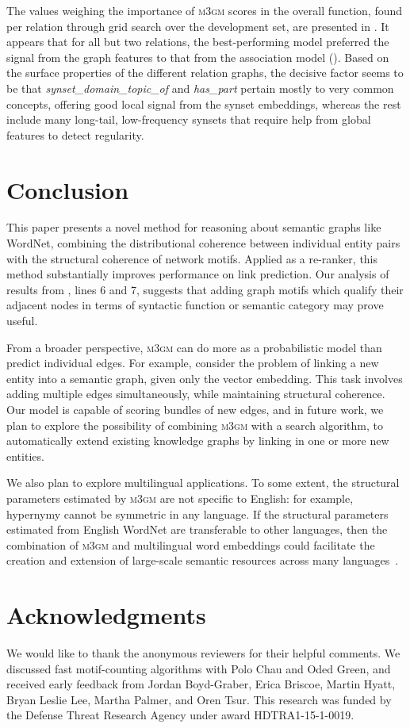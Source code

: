 \documentclass[11pt,twocolumn]{article}
\newcommand{\WN}[0]{WordNet}
\newcommand{\sysname}[0]{\textsc{m3gm}}
\begin{document}
The  values weighing the importance of \sysname{} scores in the overall function, found per relation through grid search over the development set, are presented in .
It appears that for all but two relations, the best-performing model preferred the signal from the graph features to that from the association model ().
Based on the surface properties of the different relation graphs, the decisive factor seems to be that \textit{synset\_domain\_topic\_of} and \textit{has\_part}  pertain mostly to very common concepts, offering good local signal from the synset embeddings, whereas the rest include many long-tail, low-frequency synsets that require help from global features to detect regularity.
 
\pagebreak

\section{Conclusion}
This paper presents a novel method for reasoning about semantic graphs like \WN, combining the distributional coherence between individual entity pairs with the structural coherence of network motifs.
Applied as a re-ranker, this method substantially improves performance on link prediction.
Our analysis of results from , lines 6 and 7, suggests that adding graph motifs which qualify their adjacent nodes in terms of syntactic function or semantic category may prove useful.

From a broader perspective, \sysname{} can do more as a probabilistic model than predict individual edges.
For example, consider the problem of linking a new entity into a semantic graph, given only the vector embedding.
This task involves adding multiple edges simultaneously, while maintaining structural coherence.
Our model is capable of scoring bundles of new edges, and in future work, we plan to explore the possibility of combining \sysname{} with a search algorithm, to automatically extend existing knowledge graphs by linking in one or more new entities.

We also plan to explore multilingual applications.
To some extent, the structural parameters estimated by \sysname{} are not specific to English: for example, hypernymy cannot be symmetric in any language.
If the structural parameters estimated from English \WN{} are transferable to other languages, then the combination of \sysname{} and multilingual word embeddings could facilitate the creation and extension of large-scale semantic resources across many languages~\cite{fellbaum2012challenges,bond2013linking,lafourcade2007making}.

\section*{Acknowledgments}
We would like to thank the anonymous reviewers for their helpful comments. We discussed fast motif-counting algorithms with Polo Chau and Oded Green, and received early feedback from Jordan Boyd-Graber, Erica Briscoe, Martin Hyatt, Bryan Leslie Lee, Martha Palmer, and Oren Tsur.
This research was funded by the Defense Threat Research Agency under award HDTRA1-15-1-0019.
 


\end{document}
